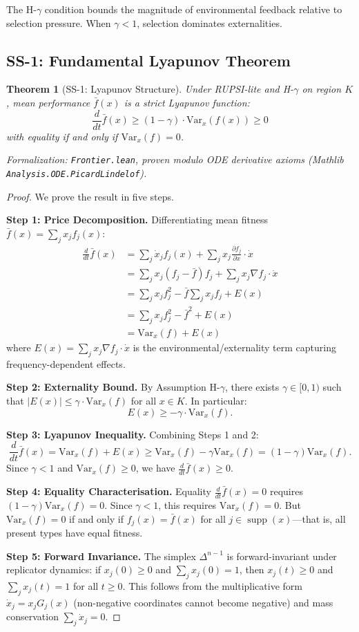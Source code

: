 \documentclass[12pt]{article}
\newtheorem{theorem}{Theorem}[section]
\newcommand{\Var}{\mathrm{Var}}
\DeclareMathOperator{\supp}{supp}
\begin{document}
The H-$\gamma$ condition bounds the magnitude of environmental feedback relative to selection pressure. When $\gamma < 1$, selection dominates externalities.

\subsection{SS-1: Fundamental Lyapunov Theorem}

\begin{theorem}[SS-1: Lyapunov Structure]
\label{thm:ss1}
Under RUPSI-lite and H-$\gamma$ on region $K$, mean performance $\bar{f}(x)$ is a strict Lyapunov function:
\[
\frac{d}{dt} \bar{f}(x) \geq (1 - \gamma) \cdot \Var_x(f(x)) \geq 0
\]
with equality if and only if $\Var_x(f) = 0$.
\end{theorem}
\noindent\textit{Formalization: \texttt{Frontier.lean}, proven modulo ODE derivative axioms (Mathlib \texttt{Analysis.ODE.PicardLindelof}).}

\begin{proof}
We prove the result in five steps.

\textbf{Step 1: Price Decomposition.}
Differentiating mean fitness $\bar{f}(x) = \sum_j x_j f_j(x)$:
\begin{align*}
\frac{d}{dt} \bar{f}(x) &= \sum_j \dot{x}_j f_j(x) + \sum_j x_j \frac{\partial f_j}{\partial x} \cdot \dot{x} \\
&= \sum_j x_j(f_j - \bar{f}) f_j + \sum_j x_j \nabla f_j \cdot \dot{x} \\
&= \sum_j x_j f_j^2 - \bar{f} \sum_j x_j f_j + E(x) \\
&= \sum_j x_j f_j^2 - \bar{f}^2 + E(x) \\
&= \Var_x(f) + E(x)
\end{align*}
where $E(x) = \sum_j x_j \nabla f_j \cdot \dot{x}$ is the environmental/externality term capturing frequency-dependent effects.

\textbf{Step 2: Externality Bound.}
By Assumption H-$\gamma$, there exists $\gamma \in [0,1)$ such that $|E(x)| \leq \gamma \cdot \Var_x(f)$ for all $x \in K$. In particular:
\[
E(x) \geq -\gamma \cdot \Var_x(f).
\]

\textbf{Step 3: Lyapunov Inequality.}
Combining Steps 1 and 2:
\[
\frac{d}{dt} \bar{f}(x) = \Var_x(f) + E(x) \geq \Var_x(f) - \gamma \Var_x(f) = (1 - \gamma) \Var_x(f).
\]
Since $\gamma < 1$ and $\Var_x(f) \geq 0$, we have $\frac{d}{dt} \bar{f}(x) \geq 0$.

\textbf{Step 4: Equality Characterisation.}
Equality $\frac{d}{dt} \bar{f}(x) = 0$ requires $(1 - \gamma) \Var_x(f) = 0$. Since $\gamma < 1$, this requires $\Var_x(f) = 0$. But $\Var_x(f) = 0$ if and only if $f_j(x) = \bar{f}(x)$ for all $j \in \supp(x)$---that is, all present types have equal fitness.

\textbf{Step 5: Forward Invariance.}
The simplex $\Delta^{n-1}$ is forward-invariant under replicator dynamics: if $x_j(0) \geq 0$ and $\sum_j x_j(0) = 1$, then $x_j(t) \geq 0$ and $\sum_j x_j(t) = 1$ for all $t \geq 0$. This follows from the multiplicative form $\dot{x}_j = x_j G_j(x)$ (non-negative coordinates cannot become negative) and mass conservation $\sum_j \dot{x}_j = 0$.
\end{proof}
\end{document}
